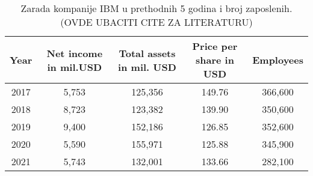\documentclass[a4paper]{article}
\begin{document}
\begin{table}[h!]
\begin{center}
\caption{Zarada kompanije IBM u prethodnih 5 godina i broj zaposlenih.(OVDE UBACITI CITE ZA LITERATURU)}
\begin{tabular}{|c|c|c|c|c|} \hline
Year& Net income in mil.USD& Total assets in mil. USD& Price per share in USD& Employees \\ \hline
2017	&5,753	&125,356	&149.76	&366,600\\ \hline
2018	&8,723	&123,382	&139.90	&350,600\\ \hline
2019	&9,400	&152,186	&126.85	&352,600\\ \hline
2020	&5,590	&155,971	&125.88	&345,900\\ \hline
2021	&5,743	&132,001	&133.66	&282,100\\ \hline

\end{tabular}
\label{tab:tabela1}
\end{center}
\end{table}


\end{document}
